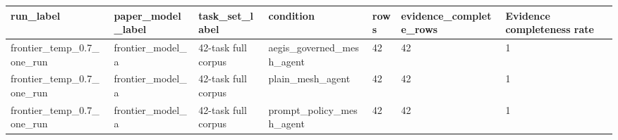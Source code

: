 \begin{tabular}{lllllll}
 \hline
run\_label & paper\_model\_label & task\_set\_label & condition & rows & evidence\_complete\_rows & Evidence completeness rate \\
 \hline
frontier\_temp\_0.7\_one\_run & frontier\_model\_a & 42-task full corpus & aegis\_governed\_mesh\_agent & 42 & 42 & 1 \\
frontier\_temp\_0.7\_one\_run & frontier\_model\_a & 42-task full corpus & plain\_mesh\_agent & 42 & 42 & 1 \\
frontier\_temp\_0.7\_one\_run & frontier\_model\_a & 42-task full corpus & prompt\_policy\_mesh\_agent & 42 & 42 & 1 \\
 \hline
\end{tabular}
